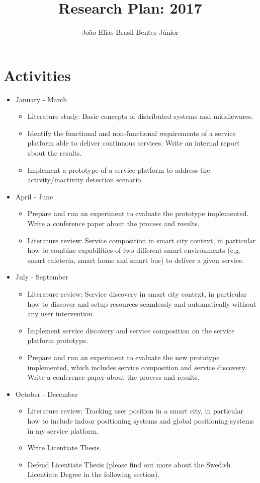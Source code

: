 \documentclass[]{report}
\title{Research Plan: 2017}
\author{Jo\~{a}o Elias Brasil Bentes J\'{u}nior}
\begin{document}
\maketitle

\section*{Activities}

\begin{itemize}
	\item January - March
		\begin{itemize}		
			\item Literature study: Basic concepts of distributed systems and middlewares.
			\item Identify the functional and non-functional requirements of a service platform able to deliver continuous services. Write an internal report about the results.
			\item Implement a prototype of a service platform to address the activity/inactivity detection scenario. 
		\end{itemize}
	\item April - June
		\begin{itemize}		
			\item Prepare and run an experiment to evaluate the prototype implemented. Write a conference paper about the process and results.
			\item Literature review: Service composition in smart city context, in particular how to combine capabilities of two different smart environments (e.g. smart cafeteria, smart home and smart bus)  to deliver a given service.
		\end{itemize}
	\item July - September
		\begin{itemize}		
			\item Literature review: Service discovery in smart city context, in particular how to discover and setup resources seamlessly and automatically without any user intervention.
			\item Implement service discovery and service composition on the service platform prototype.
			\item Prepare and run an experiment to evaluate the new prototype implemented, which includes service composition and service discovery. Write a conference paper about the process and results.
		\end{itemize}
	\item October - December
		\begin{itemize}		
			\item Literature review: Tracking user position in a smart city, in particular how to include indoor positioning systems and global positioning systems in my service platform.
			\item Write Licentiate Thesis.
			\item Defend Licentiate Thesis (please find out more about the Swedish Licentiate Degree in the following section).
		\end{itemize}
\end{itemize}
\end{document}
